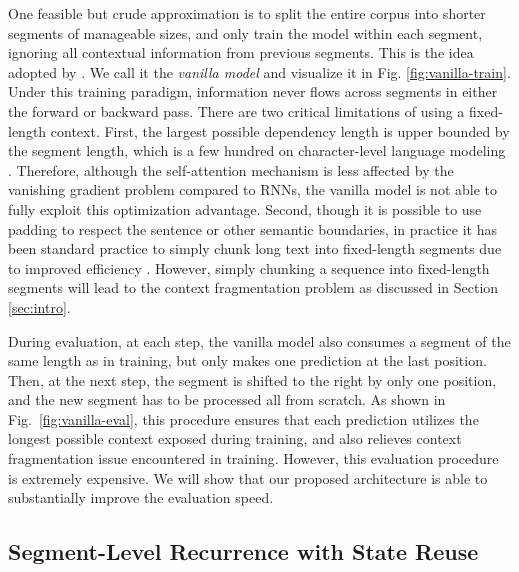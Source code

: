 \documentclass[11pt,a4paper]{article}
\begin{document}
One feasible but crude approximation is to split the entire corpus into shorter segments of manageable sizes, and only train the model within each segment, ignoring all contextual information from previous segments.
This is the idea adopted by \citet{al2018character}. We call it the \textit{vanilla model} and visualize it in Fig. \ref{fig:vanilla-train}.
Under this training paradigm, information never flows across segments in either the forward or backward pass.
There are two critical limitations of using a fixed-length context.
First, the largest possible dependency length is upper bounded by the segment length, which is a few hundred on character-level language modeling \citep{al2018character}.
Therefore, although the self-attention mechanism is less affected by the vanishing gradient problem compared to RNNs, the vanilla model is not able to fully exploit this optimization advantage.
Second, though it is possible to use padding to respect the sentence or other semantic boundaries, in practice it has been standard practice to simply chunk long text into fixed-length segments due to improved efficiency \citep{peters2018deep,devlin2018bert,al2018character}. However, simply chunking a sequence into fixed-length segments will lead to the context fragmentation problem as discussed in Section \ref{sec:intro}.

During evaluation, at each step, the vanilla model also consumes a segment of the same length as in training, but only makes one prediction at the last position.
Then, at the next step, the segment is shifted to the right by only one position, and the new segment has to be processed all from scratch.
As shown in Fig.~\ref{fig:vanilla-eval}, this procedure ensures that each prediction utilizes the longest possible context exposed during training, and also relieves context fragmentation issue encountered in training. However, this evaluation procedure is extremely expensive. We will show that our proposed architecture is able to substantially improve the evaluation speed.

\subsection{Segment-Level Recurrence with State Reuse}
\end{document}
